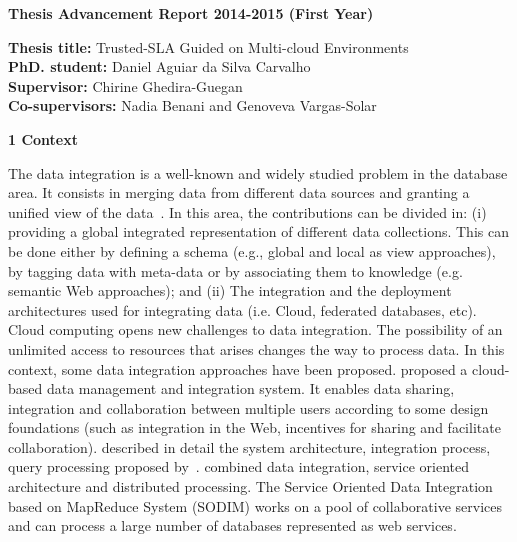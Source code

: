 \documentclass[12pt,a4paper,oneside]{report}
\author{Daniel Aguiar da Silva Carvalho}
\begin{document}
\sffamily
\begin{center}
\textbf{\large{Thesis Advancement Report 2014-2015 (First Year)}}
\end{center}

\begin{flushleft}
\textbf{Thesis title:} Trusted-SLA Guided on Multi-cloud Environments \\
\textbf{PhD. student:} Daniel Aguiar da Silva Carvalho \\
\textbf{Supervisor:} Chirine Ghedira-Guegan \\ 
\textbf{Co-supervisors:} Nadia Benani and Genoveva Vargas-Solar
\end{flushleft}


\begin{flushleft}
\textbf{1 Context}\\
\end{flushleft} 

The data integration is a well-known and widely studied problem in the database area. 
It consists in merging data from different data sources and granting a unified view of the data~\cite{Lenzerini:2002}. 
%
In this area, the contributions can be divided in: (i) providing a global integrated representation of different data collections. This can be done either by defining a schema (e.g., global and local as view approaches), by tagging data with meta-data or by associating them to knowledge (e.g. semantic Web approaches); and (ii) The integration and the deployment architectures used for integrating data (i.e. Cloud, federated databases, etc).
%
Cloud computing opens new challenges to data integration. 
The possibility of an unlimited access to resources that arises changes the way to process data.
In this context, some data integration approaches have been proposed.
\cite{Gonzalez:2010b} proposed a cloud-based data management and integration system.
It enables data sharing, integration and collaboration between multiple users according to some design foundations (such as integration in the Web, incentives for sharing and facilitate collaboration). 
\cite{Gonzalez:2010} described in detail the system architecture, integration process, query processing proposed by~\cite{Gonzalez:2010b}. 
\cite{078} combined data integration, service oriented architecture and distributed processing. 
The Service Oriented Data Integration based on MapReduce System (SODIM) works on a pool of collaborative services and can process a large number of databases represented as web services. 
\end{document}
